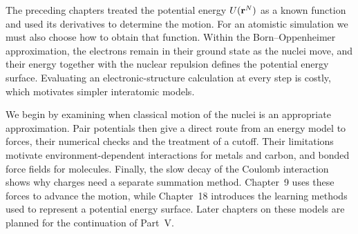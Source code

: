 The preceding chapters treated the potential energy $U(\bm{\mathrm{r}}^N)$ as a
known function and used its derivatives to determine the motion. For an
atomistic simulation we must also choose how to obtain that function.
Within the Born--Oppenheimer approximation, the electrons remain in their
ground state as the nuclei move, and their energy together with the
nuclear repulsion defines the potential energy surface. Evaluating an
electronic-structure calculation at every step is costly, which motivates
simpler interatomic models.

We begin by examining when classical motion of the nuclei is an
appropriate approximation. Pair potentials then give a direct route from
an energy model to forces, their numerical checks and the treatment of a
cutoff. Their limitations motivate environment-dependent interactions for
metals and carbon, and bonded force fields for molecules. Finally, the
slow decay of the Coulomb interaction shows why charges need a separate
summation method. Chapter~9 uses these forces to advance the motion,
while Chapter~18 introduces the learning methods used to represent a
potential energy surface. Later chapters on these models are planned
for the continuation of Part~V.
